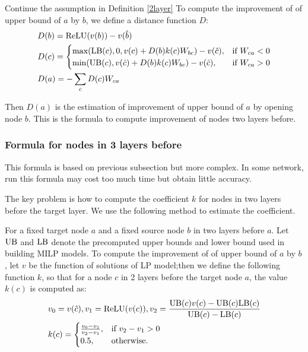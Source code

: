 \begin{definition}
	Continue the assumption in Definition \ref{2layer} To compute the improvement of of upper bound of $a$ by $b$, we define a distance function $D$:
	\begin{align*}
		&D(b) = \mathrm{ReLU}(v(b))-v(\hat{b})\\
			&D(c) =
		\begin{cases}
			\max(\mathrm{LB}(c), 0, v(c)+D(b)k(c)W_{bc})-v(\hat{c}), & \text{if }W_{ca} < 0\\
			\min(\mathrm{UB}(c), v(\hat{c})+D(b)k(c)W_{bc})-v(\hat{c}), & \text{if }  W_{ca} > 0
		\end{cases}\\
		&D(a) = -\sum_c D(c)W_{ca}
	\end{align*}
\end{definition}

Then $D(a)$ is the estimation of improvement of upper bound of $a$ by opening node $b$. This is the formula to compute improvement of nodes two layers before.


\subsubsection*{Formula for nodes in 3 layers before} 

This formula is based on previous subsection but more complex. In some network, run this formula may cost too much time but obtain little accuracy. 

The key problem is how to compute the coefficient $k$ for nodes in two layers before the target layer. We use the following method to estimate the coefficient.

\begin{definition}\label{3layer}
	For a fixed target node $a$ and a fixed source node $b$ in two layers before $a$. Let $\mathrm{UB}$ and $\mathrm{LB}$ denote the precomputed upper bounds and lower bound used in building MILP models. To compute the improvement of of upper bound of $a$ by $b$, let $v$ be the function of solutions of LP model;then we define the following function $k$, so that for a node $c$ in 2 layers before the target node $a$, the value $k(c)$ is computed as:
	\begin{align*}
		&v_0 = v(\hat{c}), v_1 = \mathrm{ReLU}(v(c)), v_2 = \frac{\mathrm{UB}(c)v(c)-\mathrm{UB}(c)\mathrm{LB}(c)}{\mathrm{UB}(c)-\mathrm{LB}(c)}\\
		&k(c) =
		\begin{cases}
			\frac{v_0-v_1}{v_2-v_1}, & \text{if } v_2-v_1 > 0\\
			0.5, & \text{otherwise.}
		\end{cases}
	\end{align*} 
\end{definition} 


